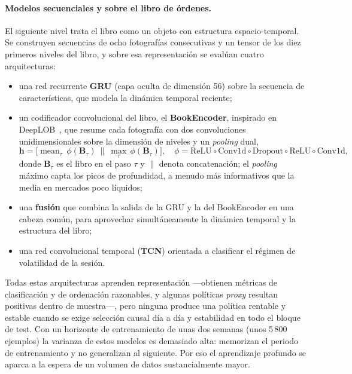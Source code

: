 \paragraph{Modelos secuenciales y sobre el libro de órdenes.} El siguiente nivel trata el
libro como un objeto con estructura espacio-temporal. Se construyen secuencias de ocho
fotografías consecutivas y un tensor de los diez primeros niveles del libro, y sobre esa
representación se evalúan cuatro arquitecturas:
\begin{itemize}[noitemsep]
\item una red recurrente \textbf{GRU} (capa oculta de dimensión 56) sobre la secuencia de
características, que modela la dinámica temporal reciente;
\item un codificador convolucional del libro, el \textbf{BookEncoder}, inspirado en
DeepLOB~\cite{zhang2019deeplob,tsantekidis2017}, que resume cada fotografía con dos
convoluciones unidimensionales sobre la dimensión de niveles y un \emph{pooling} dual,
\begin{equation}
\mathbf{h} = \big[\operatorname{mean}_\tau\, \phi(\mathbf{B}_\tau)\ \|\ \operatorname{max}_\tau\, \phi(\mathbf{B}_\tau)\big],
\quad
\phi = \text{ReLU}\!\circ\!\text{Conv1d}\!\circ\!\text{Dropout}\!\circ\!\text{ReLU}\!\circ\!\text{Conv1d},
\end{equation}
donde $\mathbf{B}_\tau$ es el libro en el paso $\tau$ y $\|$ denota concatenación; el
\emph{pooling} máximo capta los picos de profundidad, a menudo más informativos que la media
en mercados poco líquidos;
\item una \textbf{fusión} que combina la salida de la GRU y la del BookEncoder en una cabeza
común, para aprovechar simultáneamente la dinámica temporal y la estructura del libro;
\item una red convolucional temporal (\textbf{TCN}) orientada a clasificar el régimen de
volatilidad de la sesión.
\end{itemize}
Todas estas arquitecturas aprenden representación —obtienen métricas de clasificación y de
ordenación razonables, y algunas políticas \emph{proxy} resultan positivas dentro de
muestra—, pero ninguna produce una política rentable y estable cuando se exige selección
causal día a día y estabilidad en todo el bloque de test. Con un horizonte de entrenamiento
de unas dos semanas (unos 5\,800 ejemplos) la varianza de estos modelos es demasiado alta:
memorizan el periodo de entrenamiento y no generalizan al siguiente. Por eso el aprendizaje
profundo se aparca a la espera de un volumen de datos sustancialmente mayor.

